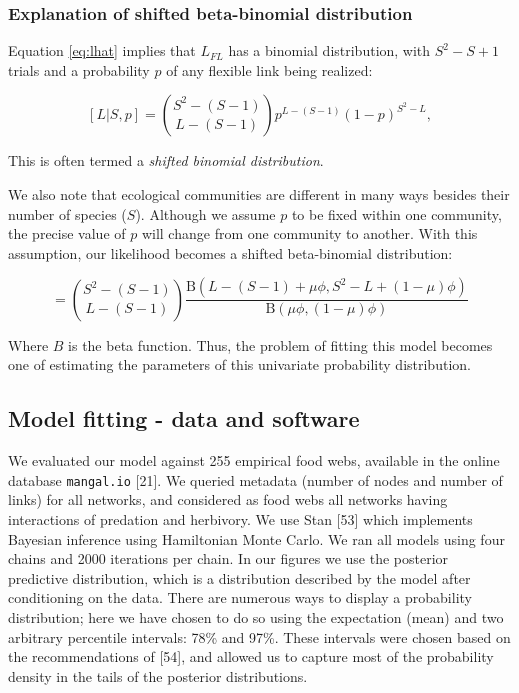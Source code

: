 \documentclass[12pt]{article}
\begin{document}
\hypertarget{explanation-of-shifted-beta-binomial-distribution}{%
\subsubsection{Explanation of shifted beta-binomial
distribution}\label{explanation-of-shifted-beta-binomial-distribution}}

Equation \cref{eq:lhat} implies that \(L_{FL}\) has a binomial
distribution, with \(S^2 - S + 1\) trials and a probability \(p\) of any
flexible link being realized:

\[
[L | S, p] = { S^2 - (S - 1) \choose L - (S - 1)} p^{L-(S-1)}(1-p)^{S^2 - L} ,
\]

This is often termed a \emph{shifted binomial distribution}.

We also note that ecological communities are different in many ways
besides their number of species (\(S\)). Although we assume \(p\) to be
fixed within one community, the precise value of \(p\) will change from
one community to another. With this assumption, our likelihood becomes a
shifted beta-binomial distribution:

\begin{equation}
[L|S,\mu, \phi] =  { S^2 - (S - 1) \choose L - (S - 1)} \frac{\mathrm{B}(L - (S - 1) + \mu \phi, S^2 - L + (1 - \mu)\phi)}{\mathrm{B}(\mu \phi, (1 - \mu)\phi)}
\label{eq:shiftBB2}\end{equation}

Where \(B\) is the beta function. Thus, the problem of fitting this
model becomes one of estimating the parameters of this univariate
probability distribution.

\hypertarget{model-fitting---data-and-software}{%
\subsection{Model fitting - data and
software}\label{model-fitting---data-and-software}}

We evaluated our model against 255 empirical food webs, available in the
online database \texttt{mangal.io} {[}21{]}. We queried metadata (number
of nodes and number of links) for all networks, and considered as food
webs all networks having interactions of predation and herbivory. We use
Stan {[}53{]} which implements Bayesian inference using Hamiltonian
Monte Carlo. We ran all models using four chains and 2000 iterations per
chain. In our figures we use the posterior predictive distribution,
which is a distribution described by the model after conditioning on the
data. There are numerous ways to display a probability distribution;
here we have chosen to do so using the expectation (mean) and two
arbitrary percentile intervals: 78\% and 97\%. These intervals were
chosen based on the recommendations of {[}54{]}, and allowed us to
capture most of the probability density in the tails of the posterior
distributions.
\end{document}
